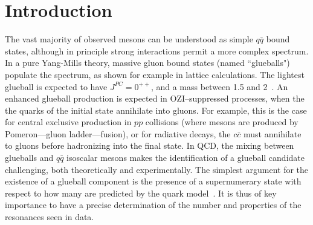 \section{Introduction}
\label{sec:intro}

The  vast majority of observed mesons can be understood as simple $q\bar q$ bound states, although in principle strong interactions permit a more complex spectrum. 
In a pure Yang-Mills theory, massive gluon bound states
(named ``glueballs") populate the spectrum, as shown for example in lattice calculations.
The lightest glueball is expected to have
$J^{PC} = 0^{++}$, and a mass between 1.5 and 2\gev~\cite{Bali:1993fb,Patel:1986vv,Albanese:1987ds,Michael:1988jr,Sexton:1995kd,Morningstar:1999rf,Szczepaniak:2003mr,Chen:2005mg,Athenodorou:2020ani}. 
An enhanced glueball production is expected in OZI--suppressed processes,  \ie when the the quarks of the initial state annihilate into gluons.
For example, this is the case for central exclusive  production in $pp$ collisions (where mesons are produced by Pomeron---\ie gluon ladder---fusion),
or for \jpsi radiative decays, the $c \bar c$ must annihilate to gluons before hadronizing into the final state.  
In QCD, the mixing between glueballs and $q\bar q$ isoscalar  mesons makes the identification of a glueball candidate challenging, both theoretically and experimentally. The simplest argument for the existence of a glueball component is the presence of a supernumerary state with respect to how many are predicted by the quark model~\cite{Mathieu:2008me,Ochs:2013gi,Llanes-Estrada:2021evz}. 
It is thus of key importance to 
have a precise determination of the number and properties of the resonances seen in data. 

